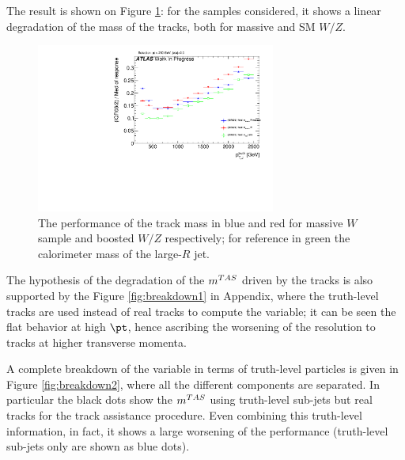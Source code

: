 The result is shown on Figure \ref{fig:trackdegrade}: for the samples considered, it shows a linear degradation of the mass of the tracks, both for massive and SM $W/Z$.

\begin{figure}[!ht]
  \centering
      \includegraphics[width=0.7\textwidth]{jet_part/calib/71graphcftr_h_JetRatio_mJ12CALOIQRoMcalib_trkmass.pdf}
  \caption[Track mass degradation in tops and massive $W/Z$]{The performance of the track mass in blue and red for massive $W$ sample and boosted $W/Z$ respectively; for reference in green the calorimeter mass of the large-$R$ jet.}
  \label{fig:trackdegrade}
\end{figure}

The hypothesis of the degradation of the $m^{TAS}$ driven by the tracks is also supported by the Figure \ref{fig:breakdown1} in Appendix, where the truth-level tracks are used instead of real tracks to compute the variable; it can be seen the flat behavior at high $\pt$, hence ascribing the worsening of the resolution to tracks at higher transverse momenta.


A complete breakdown of the variable in terms of truth-level particles is given in Figure \ref{fig:breakdown2}, where all the different components are separated.
In particular the black dots show the $m^{TAS}$ using truth-level sub-jets but real tracks for the track assistance procedure.
Even combining this truth-level information, in fact, it shows a large worsening of the performance (truth-level sub-jets only are shown as blue dots).


